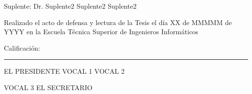 \documentclass[twoside,11pt,table,xcdraw]{Latex/Classes/PhDthesisPSnPDF}
\begin{document}
\vspace{5mm}
Suplente: \hspace{1.5mm} Dr. Suplente2 Suplente2 Suplente2

\vspace{10mm}
\noindent Realizado el acto de defensa y lectura de la Tesis el d\'{i}a XX de MMMMM de YYYY en la Escuela T\'ecnica Superior de Ingenieros Inform\'aticos

\vspace{5mm}
\noindent Calificaci\'{o}n: \rule{123mm}{0.2mm}
\vspace{20mm}

EL PRESIDENTE \hspace{30mm} VOCAL 1 \hspace{30mm} VOCAL 2

\vspace{30mm}
\hspace{15mm} VOCAL 3 \hspace{45mm} EL SECRETARIO





\cleardoublepage

\cleardoublepage




\cleardoublepage


%   


\cleardoublepage
\setcounter{secnumdepth}{3} %
\setcounter{tocdepth}{2}    %
\tableofcontents           %
\end{document}
